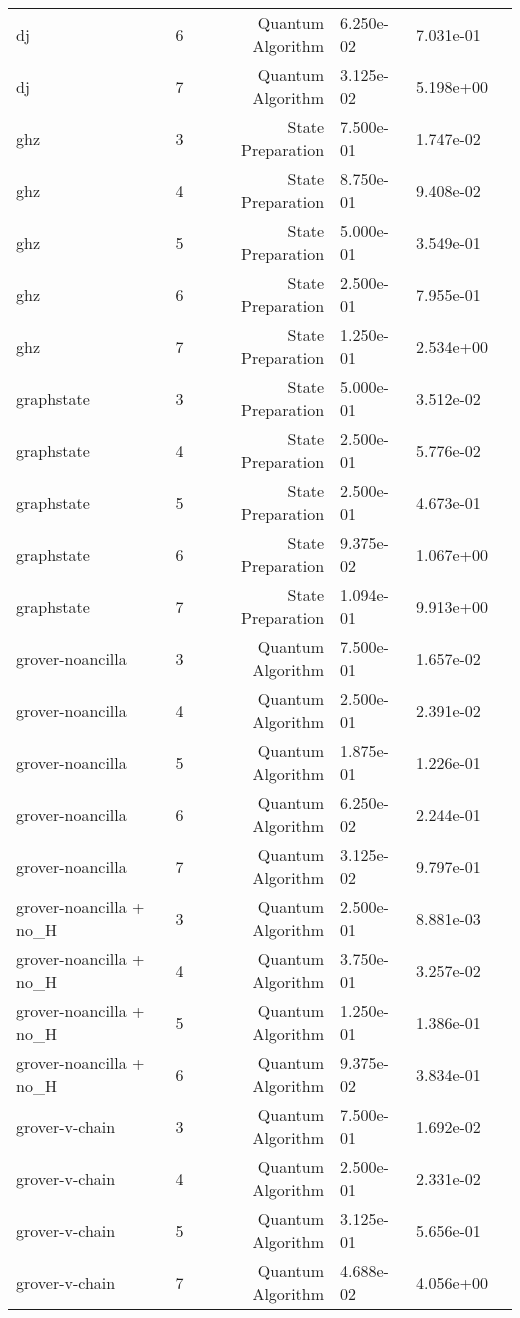 \begin{table}
\begin{tabular}{llrlll}
dj & 6 & Quantum Algorithm & 6.250e-02 & 7.031e-01 \\
dj & 7 & Quantum Algorithm & 3.125e-02 & 5.198e+00 \\
\midrule
ghz & 3 & State Preparation & 7.500e-01 & 1.747e-02 \\
ghz & 4 & State Preparation & 8.750e-01 & 9.408e-02 \\
ghz & 5 & State Preparation & 5.000e-01 & 3.549e-01 \\
ghz & 6 & State Preparation & 2.500e-01 & 7.955e-01 \\
ghz & 7 & State Preparation & 1.250e-01 & 2.534e+00 \\
\midrule
graphstate & 3 & State Preparation & 5.000e-01 & 3.512e-02 \\
graphstate & 4 & State Preparation & 2.500e-01 & 5.776e-02 \\
graphstate & 5 & State Preparation & 2.500e-01 & 4.673e-01 \\
graphstate & 6 & State Preparation & 9.375e-02 & 1.067e+00 \\
graphstate & 7 & State Preparation & 1.094e-01 & 9.913e+00 \\
\midrule
grover-noancilla & 3 & Quantum Algorithm & 7.500e-01 & 1.657e-02 \\
grover-noancilla & 4 & Quantum Algorithm & 2.500e-01 & 2.391e-02 \\
grover-noancilla & 5 & Quantum Algorithm & 1.875e-01 & 1.226e-01 \\
grover-noancilla & 6 & Quantum Algorithm & 6.250e-02 & 2.244e-01 \\
grover-noancilla & 7 & Quantum Algorithm & 3.125e-02 & 9.797e-01 \\
\midrule
grover-noancilla + no_H & 3 & Quantum Algorithm & 2.500e-01 & 8.881e-03 \\
grover-noancilla + no_H & 4 & Quantum Algorithm & 3.750e-01 & 3.257e-02 \\
grover-noancilla + no_H & 5 & Quantum Algorithm & 1.250e-01 & 1.386e-01 \\
grover-noancilla + no_H & 6 & Quantum Algorithm & 9.375e-02 & 3.834e-01 \\
\midrule
grover-v-chain & 3 & Quantum Algorithm & 7.500e-01 & 1.692e-02 \\
grover-v-chain & 4 & Quantum Algorithm & 2.500e-01 & 2.331e-02 \\
grover-v-chain & 5 & Quantum Algorithm & 3.125e-01 & 5.656e-01 \\
grover-v-chain & 7 & Quantum Algorithm & 4.688e-02 & 4.056e+00 \\

\end{tabular}
\end{table}
